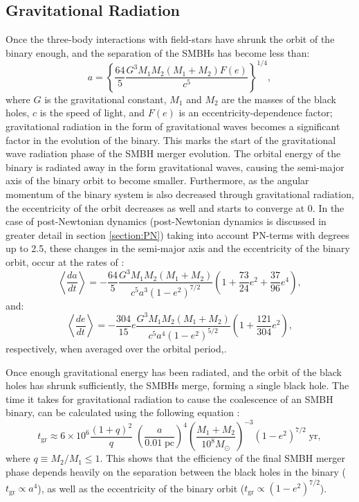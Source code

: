 \documentclass[english, oneside]{HYgradu}
\begin{document}
\subsection{Gravitational Radiation}

Once the three-body interactions with field-stars have shrunk the orbit of the binary enough, and the separation of the SMBHs has become less than:
\begin{equation}
a = \left\lbrace \frac{64}{5} \frac{G^3M_1M_2(M_1+M_2)F(e)}{c^5} \right\rbrace^{1/4},
\end{equation}
where $G$ is the gravitational constant, $M_1$ and $M_2$ are the masses of the black holes, $c$ is the speed of light, and $F(e)$ is an eccentricity-dependence factor; gravitational radiation in the form of gravitational waves becomes a significant factor in the evolution of the binary. This marks the start of the gravitational wave radiation phase of the SMBH merger evolution. The orbital energy of the binary is radiated away in the form gravitational waves, causing the semi-major axis of the binary orbit to become smaller. Furthermore, as the angular momentum of the binary system is also decreased through gravitational radiation, the eccentricity of the orbit decreases as well and starts to converge at $0$. In the case of post-Newtonian dynamics (post-Newtonian dynamics is discussed in greater detail in section \ref{section:PN}) taking into account PN-terms with degrees up to 2.5, these changes in the semi-major axis and the eccentricity of the binary orbit, occur at the rates of \citep{Peters1964}:
\begin{equation}
\left\langle \frac{da}{dt} \right\rangle = -\frac{64}{5}\frac{G^3M_1M_2(M_1+M_2)}{c^5a^3(1-e^2)^{7/2}} \left( 1+\frac{73}{24}e^2+\frac{37}{96}e^4 \right),
\end{equation}
and:
\begin{equation}
\left\langle \frac{de}{dt} \right\rangle = -\frac{304}{15}e\frac{G^3M_1M_2(M_1+M_2)}{c^5a^4(1-e^2)^{5/2}} \left( 1+\frac{121}{304}e^2 \right),
\end{equation}
respectively, when averaged over the orbital period,. 

Once enough gravitational energy has been radiated, and the orbit of the black holes has shrunk sufficiently, the SMBHs merge, forming a single black hole. The time it takes for gravitational radiation to cause the coalescence of an SMBH binary, can be calculated using the following equation \citep{MerrittBook}:
\begin{equation}
t_\mathrm{gr} \approx 6 \times 10^6 \frac{(1+q)^2}{q} \; \left( \frac{a}{0.01 \; \mathrm{pc}} \right)^4 \left( \frac{M_1 + M_2}{10^8 M_\odot} \right)^{-3} (1-e^2)^{7/2} \; \mathrm{yr}, \label{eq:t_gr}
\end{equation}
where $q \equiv M_2/M_1 \leq 1$. This shows that the efficiency of the final SMBH merger phase depends heavily on the separation between the black holes in the binary ($t_\mathrm{gr} \propto a^4$), as well as the eccentricity of the binary orbit ($t_\mathrm{gr} \propto (1-e^2)^{7/2}$).
\end{document}
